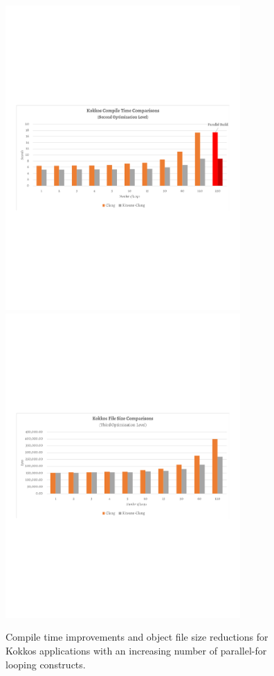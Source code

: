 \begin{figure}
  \includegraphics[width=0.8\textwidth]{projects/2.3.2-Tools/2.3.2.02-LANL-ATDM-Tools/kokkos-compile-times.png}
  \includegraphics[width=0.8\textwidth]{projects/2.3.2-Tools/2.3.2.02-LANL-ATDM-Tools/kokkos-file-size.png}
  \caption{Compile time improvements and object file size reductions for
           Kokkos applications with an increasing number of parallel-for
           looping constructs.}
  \label{fig:2.3.2.02:time_size}                      
\end{figure}


